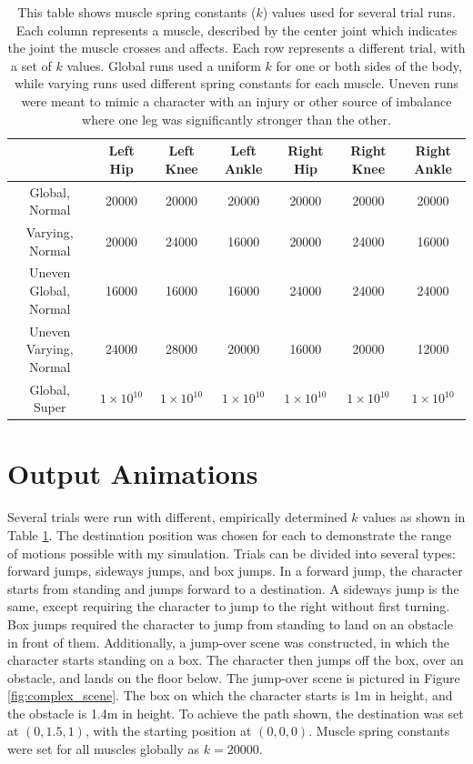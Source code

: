\begin{table}[ht]
	\centering
		\caption[Table of spring constants for each trial]{This table shows muscle spring constants ($k$) values used for several trial runs.  Each column represents a muscle, described by the center joint which indicates the joint the muscle crosses and affects.  Each row represents a different trial, with a set of $k$ values.  Global runs used a uniform $k$ for one or both sides of the body, while varying runs used different spring constants for each muscle.  Uneven runs were meant to mimic a character with an injury or other source of imbalance where one leg was significantly stronger than the other.}
	\label{tab:run_k_vals}
	\scriptsize
	\begin{tabular}{| c | c | c | c | c | c | c |}
		\hline
		& Left Hip & Left Knee & Left Ankle & Right Hip & Right Knee & Right Ankle \\ \hline
		Global, Normal & 20000 & 20000 & 20000 & 20000 & 20000 & 20000 \\ \hline
		Varying, Normal & 20000 & 24000 & 16000 & 20000 & 24000 & 16000 \\ \hline
		Uneven Global, Normal & 16000 & 16000 & 16000 & 24000 & 24000 & 24000 \\ \hline
		Uneven Varying, Normal & 24000 & 28000 & 20000 & 16000 & 20000 & 12000 \\ \hline
		Global, Super & $1 \times 10^{10}$ & $1 \times 10^{10}$ & $1 \times 10^{10}$ & $1 \times 10^{10}$ & $1 \times 10^{10}$ & $1 \times 10^{10}$ \\ \hline
	\end{tabular}
\end{table}


\section{Output Animations}
\label{section:image_results}

Several trials were run with different, empirically determined $k$ values as shown in Table \ref{tab:run_k_vals}.  The destination position was chosen for each to demonstrate the range of motions possible with my simulation.  Trials can be divided into several types: forward jumps, sideways jumps, and box jumps.  In a forward jump, the character starts from standing and jumps forward to a destination.  A sideways jump is the same, except requiring the character to jump to the right without first turning.  Box jumps required the character to jump from standing to land on an obstacle in front of them.  Additionally, a jump-over scene was constructed, in which the character starts standing on a box.  The character then jumps off the box, over an obstacle, and lands on the floor below.  The jump-over scene is pictured in Figure \ref{fig:complex_scene}.  The box on which the character starts is 1m in height, and the obstacle is 1.4m in height.  To achieve the path shown, the destination was set at $(0, 1.5, 1)$, with the starting position at $(0, 0, 0)$.  Muscle spring constants were set for all muscles globally as $k=20000$.

